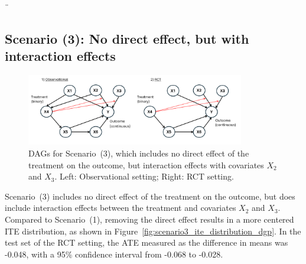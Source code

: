 \clearpage 
¨


\subsection{Scenario (3): No direct effect, but with interaction effects}

\begin{figure}[H]
\centering
\includegraphics[width=0.85\textwidth]{img/exp4_dag_3.png}
\caption{DAGs for Scenario~(3), which includes no direct effect of the treatment on the outcome, but interaction effects with covariates $X_2$ and $X_3$. Left: Observational setting; Right: RCT setting.}
\label{fig:ite_dag_observational_3}
\end{figure}

Scenario~(3) includes no direct effect of the treatment on the outcome, but does include interaction effects between the treatment and covariates $X_2$ and $X_3$. Compared to Scenario~(1), removing the direct effect results in a more centered ITE distribution, as shown in Figure~\ref{fig:scenario3_ite_distribution_dgp}. In the test set of the RCT setting, the ATE measured as the difference in means was -0.048, with a 95\% confidence interval from -0.068 to -0.028.




